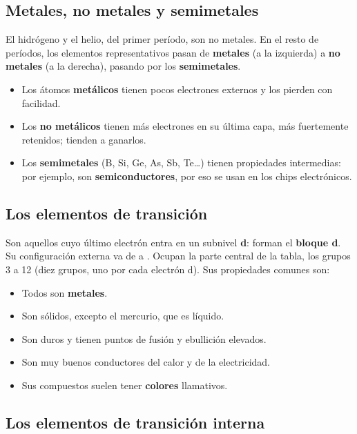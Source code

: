 \subsection{Metales, no metales y semimetales}

El hidrógeno y el helio, del primer período, son no metales. En el resto de períodos, los elementos representativos pasan de \textbf{metales} (a la izquierda) a \textbf{no metales} (a la derecha), pasando por los \textbf{semimetales}.

\begin{itemize}
    \item Los átomos \textbf{metálicos} tienen pocos electrones externos y los pierden con facilidad.
    \item Los \textbf{no metálicos} tienen más electrones en su última capa, más fuertemente retenidos; tienden a ganarlos.
    \item Los \textbf{semimetales} (B, Si, Ge, As, Sb, Te\ldots) tienen propiedades intermedias: por ejemplo, son \textbf{semiconductores}, por eso se usan en los chips electrónicos.
\end{itemize}

\subsection{Los elementos de transición}

Son aquellos cuyo último electrón entra en un subnivel \textbf{d}: forman el \textbf{bloque d}. Su configuración externa va de  a . Ocupan la parte central de la tabla, los grupos 3 a 12 (diez grupos, uno por cada electrón d). Sus propiedades comunes son:

\begin{itemize}
    \item Todos son \textbf{metales}.
    \item Son sólidos, excepto el mercurio, que es líquido.
    \item Son duros y tienen puntos de fusión y ebullición elevados.
    \item Son muy buenos conductores del calor y de la electricidad.
    \item Sus compuestos suelen tener \textbf{colores} llamativos.
\end{itemize}

\subsection{Los elementos de transición interna}

